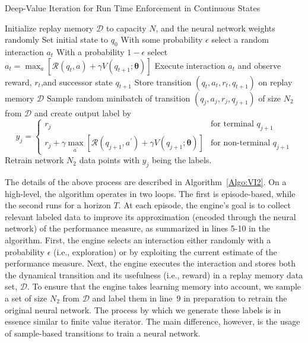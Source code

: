 \begin{algorithm}[h!]
\caption{Deep-Value Iteration for Run Time Enforcement in Continuous States}
\label{Algo:VI2}
\begin{algorithmic}[1]
\STATE Initialize replay memory $\mathcal{D}$ to capacity $N$, and the neural network weights randomly 
\STATE Set initial state to $q_{0}$
\STATE With some probability $\epsilon$ select a random interaction $a_{t}$
\STATE With a probability $1 - \epsilon$ select $a_{t} = \max_{a} \left[\mathcal{R}(q_{t}, a) + \gamma V(q_{t+1};\bm{\theta})\right]$
\STATE Execute interaction $a_{t}$ and observe reward, $r_{t}$,and successor state $q_{t+1}$
\STATE Store transition $\left(q_{t}, a_{t}, r_{t}, q_{t+1}\right)$ on replay memory $\mathcal{D}$
\STATE Sample random minibatch of transition $\left(q_{j}, a_{j}, r_{j}, q_{j+1}\right)$ of size $N_{2}$ from $\mathcal{D}$ and create output label by 
\begin{displaymath}
   y_{j} = \left\{
     \begin{array}{lr}
       r_{j} & \text{for terminal $q_{j+1}$}\\
        r_{j} + \gamma \max_{a^{\prime}}\left[\mathcal{R}(q_{j+1}, a^{\prime}) + \gamma V(q_{j+1};\bm{\theta})\right]  & \text{for non-terminal $q_{j+1}$}
     \end{array}
   \right.
\end{displaymath} 
\ENDFOR
\STATE Retrain network $N_{2}$ data points with $y_{j}$ being the labels. 
\ENDFOR
\end{algorithmic}
\end{algorithm}
The details of the above process are described in Algorithm~\ref{Algo:VI2}. On a high-level, the algorithm operates in two loops. The first is episode-based, while the second runs for a horizon $T$. At each episode, the engine's goal is to collect relevant labeled data to improve its approximation (encoded through the neural network) of the performance measure, as summarized in lines 5-10 in the algorithm. First, the engine selects an interaction either randomly with a probability $\epsilon$ (i.e., exploration) or by exploiting the current estimate of the performance measure. Next, the engine executes the interaction and stores both the dynamical transition and its usefulness (i.e., reward) in a replay memory data set, $\mathcal{D}$. To ensure that the engine takes learning memory into account, we sample a set of size $N_{2}$ from $\mathcal{D}$ and label them in line~9  in preparation to retrain the original neural network. The process by which we generate these labels is in essence similar to finite value iterator. The main difference, however, is the usage of sample-based transitions to train a neural network.  

